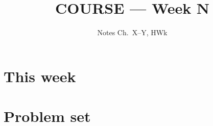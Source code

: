 \documentclass[10pt]{scrartcl}
\title{COURSE --- Week N}
\subtitle{Notes Ch.~X--Y, HWk}
\author{}
\date{}
\begin{document}
\maketitle

\section{This week}

\section{Problem set}
\end{document}
